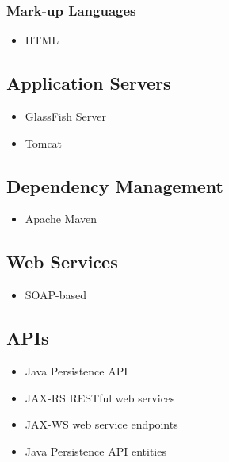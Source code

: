\subsubsection{Mark-up Languages}
\begin{itemize}
	\item HTML
\end{itemize}


\subsection{Application Servers}
\begin{itemize}
	\item GlassFish Server
	\item Tomcat
\end{itemize}

\subsection{Dependency Management}
\begin{itemize}
	\item Apache Maven
\end{itemize}

\subsection{Web Services}
\begin{itemize}
	\item SOAP-based
\end{itemize} 


\subsection{APIs}
\begin{itemize}
	\item Java Persistence API
\end{itemize}

\begin{itemize}
	\item JAX-RS RESTful web services
\end{itemize}

\begin{itemize}
	\item JAX-WS web service endpoints
\end{itemize}

\begin{itemize}
	\item Java Persistence API entities
\end{itemize}

